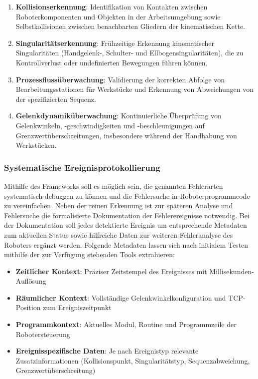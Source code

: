\begin{enumerate}
  \item \textbf{Kollisionserkennung}: Identifikation von Kontakten
    zwischen Roboterkomponenten und Objekten in der Arbeitsumgebung
    sowie Selbstkollisionen zwischen benachbarten Gliedern der
    kinematischen Kette.

  \item \textbf{Singularitätserkennung}: Frühzeitige Erkennung
    kinematischer Singularitäten (Handgelenk-, Schulter- und
    Ellbogensingularitäten), die zu Kontrollverlust oder
    undefinierten Bewegungen führen können.

  \item \textbf{Prozessflussüberwachung}: Validierung der korrekten
    Abfolge von Bearbeitungsstationen für Werkstücke und Erkennung
    von Abweichungen von der spezifizierten Sequenz.

  \item \textbf{Gelenkdynamiküberwachung}: Kontinuierliche
    Überprüfung von Gelenkwinkeln, -geschwindigkeiten und
    -beschleunigungen auf Grenzwertüberschreitungen, insbesondere
    während der Handhabung von Werkstücken.
\end{enumerate}

\subsubsection{Systematische Ereignisprotokollierung}

Mithilfe des Frameworks soll es möglich sein, die genannten Fehlerarten
systematisch debuggen zu können und die Fehlersuche in Roboterprogrammcode zu
vereinfachen. Neben der reinen Erkennung ist zur späteren Analyse und
Fehlersuche die formalisierte
Dokumentation der Fehlerereignisse notwendig. Bei der Dokumentation
soll jedes detektierte Ereignis um
entsprechende Metadaten zum aktuellen Status sowie hilfreiche Daten zur
weiteren Fehleranalyse des Roboters ergänzt werden.
Folgende Metadaten lassen sich nach initialem Testen mithilfe der zur Verfügung
stehenden Tools extrahieren:

\begin{itemize}
  \item \textbf{Zeitlicher Kontext}: Präziser Zeitstempel des
    Ereignisses mit Millisekunden-Auflösung
  \item \textbf{Räumlicher Kontext}: Vollständige
    Gelenkwinkelkonfiguration und TCP-Position zum Ereigniszeitpunkt
  \item \textbf{Programmkontext}: Aktuelles Modul, Routine und
    Programmzeile der Robotersteuerung
  \item \textbf{Ereignisspezifische Daten}: Je nach Ereignistyp
    relevante Zusatzinformationen (Kollisionspunkt, Singularitätstyp,
    Sequenzabweichung, Grenzwertüberschreitung)
\end{itemize}

